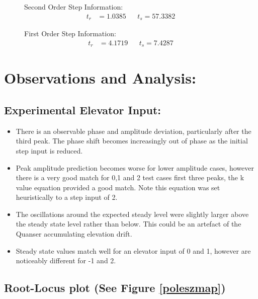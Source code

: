 \begin{figure}[H]
\centering
\begin{minipage}{.49\textwidth}
Second Order Step Information:
\begin{align*}
t_r &= 1.0385 &&t_s = 57.3382
\end{align*}
\end{minipage}
\hfill
\begin{minipage}{.49\textwidth}
First Order Step Information:
\begin{align*}
t_r &= 4.1719 &&t_s = 7.4287
\end{align*}
\end{minipage}
\vspace{-11pt}
\end{figure}

\section{Observations and Analysis:}\label{observations-and-analysis}

\subsection{Experimental Elevator
Input:}\label{experimental-elevator-input}

\begin{itemize}
\tightlist
\item
  There is an observable phase and amplitude deviation, particularly
  after the third peak. The phase shift becomes increasingly out of
  phase as the initial step input is reduced.
\item
  Peak amplitude prediction becomes worse for lower amplitude cases,
  however there is a very good match for 0,1 and 2 test cases first
  three peaks, the k value equation provided a good match. Note this
  equation was set heuristically to a step input of 2.
\item
  The oscillations around the expected steady level were slightly larger
  above the steady state level rather than below. This could be an
  artefact of the Quanser accumulating elevation drift.
\item
  Steady state values match well for an elevator input of 0 and 1,
  however are noticeably different for -1 and 2.
\end{itemize}

\subsection{\texorpdfstring{Root-Locus plot (See Figure
\ref{poleszmap})}{Root-Locus plot (See Figure )}}\label{root-locus-plot-see-figure}

